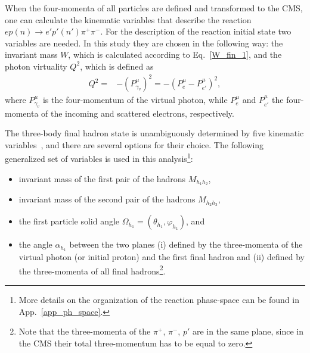 When the four-momenta of all particles are defined and transformed to the CMS, one can calculate the kinematic variables that describe the reaction $ep(n) \rightarrow e'p'(n')\pi^{+}\pi^{-}$. For the description of the reaction initial state two variables are needed. In this study they are chosen in the following way: the invariant mass $W$, which is calculated according to Eq.~\eqref{W_fin_1}, and the photon virtuality $Q^{2}$, which is defined as
\begin{eqnarray}
Q^{2}= & -(P_{\gamma_{v}}^{\mu})^{2} = -(P_{e}^{\mu}-P_{e'}^{\mu})^{2}, \label{eq:q2} 
\end{eqnarray}
where $P_{\gamma_{v}}^{\mu}$ is the four-momentum of the virtual photon, while $P_{e}^{\mu}$ and $P_{e'}^{\mu}$ the four-momenta of the incoming and scattered electrons, respectively. 



The three-body final hadron state is unambiguously determined by five kinematic variables~\cite{Fed_an_note:2017}, and there are several options for their choice. The following generalized set of variables is used in this analysis\footnote[5]{More details on the organization of the reaction phase-space can be found in App.~\ref{app_ph_space}.}:\vspace{-0.5em}

\begin{itemize}
\item invariant mass of the first pair of the hadrons $M_{h_{1}h_{2}}$,\vspace{-0.4em}
\item invariant mass of the second pair of the hadrons $M_{h_{2}h_{3}}$,\vspace{-0.4em}
\item the first particle solid angle $\Omega_{h_{1}} = (\theta_{h_{1}}, \varphi_{h_{1}})$, and\vspace{-0.4em}
\item the angle $\alpha_{h_{1}}$ between the two planes (i) defined by the three-momenta of the virtual photon (or initial proton) and the first final hadron and (ii) defined by the three-momenta of all final hadrons\footnote[6]{Note that the three-momenta of the $\pi^{+}$, $\pi^{-}$, $p'$ are in the same plane, since in the CMS their total three-momentum has to be equal to zero.}.\vspace{-0.5em}
\end{itemize}

